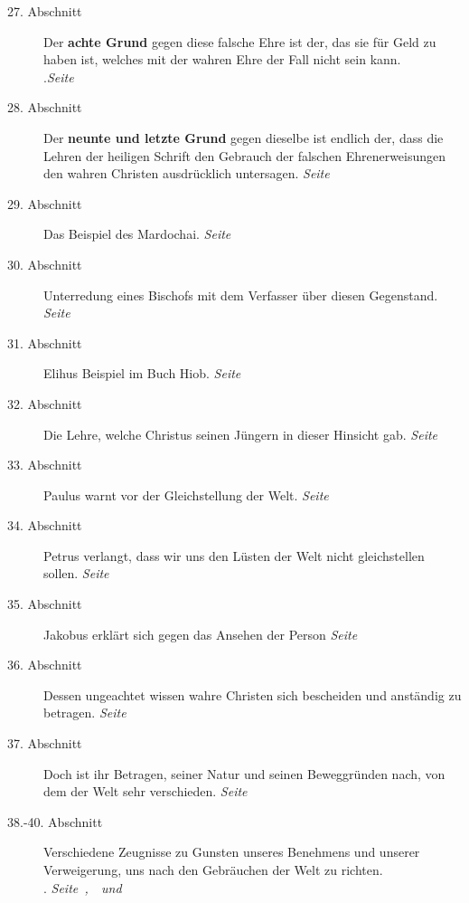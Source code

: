 \begin{description}
\item[27. Abschnitt] Der \textbf{achte Grund} gegen diese falsche Ehre ist der,
das sie
für Geld zu haben ist, welches mit der wahren Ehre der Fall nicht sein kann.\\
.\dotfill \textit{Seite~\pageref{kap9_ab27}}\\
\item[28. Abschnitt] Der \textbf{neunte und letzte Grund} gegen dieselbe ist
endlich der,
dass die Lehren der heiligen Schrift den Gebrauch der falschen Ehrenerweisungen
den wahren Christen ausdrücklich untersagen.
\dotfill \textit{Seite~\pageref{kap9_ab28}}\\
\item[29. Abschnitt] Das Beispiel des Mardochai.
\dotfill \textit{Seite~\pageref{kap9_ab29}}\\
\item[30. Abschnitt] Unterredung eines Bischofs mit dem Verfasser über diesen
Gegenstand.
\dotfill \textit{Seite~\pageref{kap9_ab30}}\\
\item[31. Abschnitt] Elihus Beispiel im Buch Hiob.
\dotfill \textit{Seite~\pageref{kap9_ab31}}\\
\item[32. Abschnitt] Die Lehre, welche Christus seinen Jüngern in dieser
Hinsicht gab.
\dotfill \textit{Seite~\pageref{kap9_ab32}}\\
\item[33. Abschnitt] Paulus warnt vor der Gleichstellung der Welt.
\dotfill \textit{Seite~\pageref{kap9_ab33}}\\
\item[34. Abschnitt] Petrus verlangt, dass wir uns den Lüsten der Welt nicht
gleichstellen sollen.
\dotfill \textit{Seite~\pageref{kap9_ab34}}\\
\item[35. Abschnitt] Jakobus erklärt sich gegen das Ansehen der Person
\dotfill \textit{Seite~\pageref{kap9_ab35}}\\
\item[36. Abschnitt] Dessen ungeachtet wissen wahre Christen sich bescheiden und
anständig zu betragen.
\dotfill \textit{Seite~\pageref{kap9_ab36}}\\
\item[37. Abschnitt] Doch ist ihr Betragen, seiner Natur und seinen Beweggründen
nach, von dem der Welt sehr verschieden.
\dotfill \textit{Seite~\pageref{kap9_ab37}}\\
\item[38.-40. Abschnitt] Verschiedene Zeugnisse zu Gunsten unseres Benehmens und
unserer Verweigerung, uns nach den Gebräuchen der Welt zu richten.\\
.\dotfill
\textit{Seite~\pageref{kap9_ab38},~\pageref{kap9_ab39}~und~\pageref{kap9_ab40}}
\\

\end{description}

